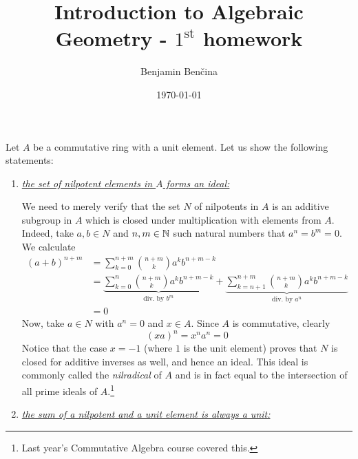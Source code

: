 \documentclass[a4paper, 12pt]{article}
\title{Introduction to Algebraic Geometry - $1^\text{st}$ homework}
\author{Benjamin Benčina}
\date{\today}
\begin{document}
\maketitle

\begin{Exercise}
    Let $A$ be a commutative ring with a unit element.
    Let us show the following statements:
    \begin{enumerate}[label=(\alph*)]
        \item \underline{\emph{the set of nilpotent elements in $A$ forms an ideal:}}

            We need to merely verify that the set $N$ of nilpotents in $A$ is an additive subgroup in $A$ which is closed under multiplication with elements from $A$.
            Indeed, take $a, b \in N$ and $n,m \in \mathbb{N}$ such natural numbers that $a^n = b^m = 0$.
            We calculate
            \begin{align*}
                (a+b)^{n+m}
                &= \sum_{k=0}^{n+m}\binom{n+m}{k}a^{k}b^{n+m-k} \\
                &= \underbrace{\sum_{k=0}^{n}\binom{n+m}{k}a^{k}b^{n+m-k}}_{\text{div. by $b^m$}} + \underbrace{\sum_{k=n+1}^{n+m}\binom{n+m}{k}a^{k}b^{n+m-k}}_{\text{div. by $a^n$}} \\
                &= 0
            \end{align*}
            Now, take $a \in N$ with $a^n = 0$ and $x \in A$. Since $A$ is commutative, clearly
            \[
                (xa)^n = x^na^n = 0
            \]
            Notice that the case $x = -1$ (where $1$ is the unit element) proves that $N$ is closed for additive inverses as well, and hence an ideal.
            This ideal is commonly called the \emph{nilradical} of $A$ and is in fact equal to the intersection of all prime ideals of $A$.\footnote{Last year's Commutative Algebra course covered this.}
        \item \underline{\emph{the sum of a nilpotent and a unit element is always a unit:}}


\end{enumerate}
\end{Exercise}
\end{document}
